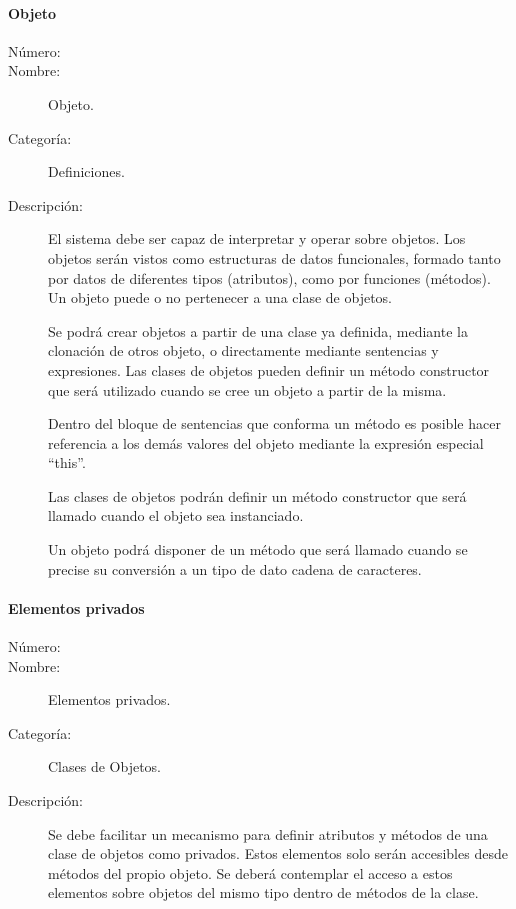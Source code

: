 \paragraph{Objeto}
\begin{framed}
	\begin{description}
		\item [Número:] \cn
		\item [Nombre:] Objeto.
		\item [Categoría:] Definiciones.
		\item [Descripción:] El sistema debe ser capaz de interpretar y operar sobre objetos. Los objetos serán vistos
		como estructuras de datos funcionales, formado tanto por datos de diferentes tipos (atributos), como por funciones (métodos). Un objeto
		puede o no pertenecer a una clase de objetos. 
      
      Se podrá crear objetos a partir de una clase ya definida, mediante la clonación de otros objeto, o directamente
		mediante sentencias y expresiones. Las clases de objetos pueden definir un método constructor que será utilizado cuando se cree un
		objeto a partir de la misma. 
      
      Dentro del bloque de sentencias que conforma un método es posible hacer referencia a los demás valores del objeto mediante 
      la expresión especial ``this''.
      
      Las clases de objetos podrán definir un método constructor que será llamado cuando el objeto sea instanciado. 
      
      Un objeto podrá disponer de un método que será llamado cuando se precise su conversión a un tipo de dato cadena de caracteres.
	\end {description}
\end{framed}

\paragraph{Elementos privados}
\begin{framed}
	\begin{description}
		\item [Número:] \cn
		\item [Nombre:] Elementos privados.
		\item [Categoría:] Clases de Objetos.
		\item [Descripción:] Se debe facilitar un mecanismo para definir atributos y métodos de una clase de objetos como privados. 
      Estos elementos solo serán accesibles desde métodos del propio objeto. Se deberá contemplar el acceso a estos elementos
      sobre objetos del mismo tipo dentro de métodos de la clase.
	\end{description}
\end{framed}

